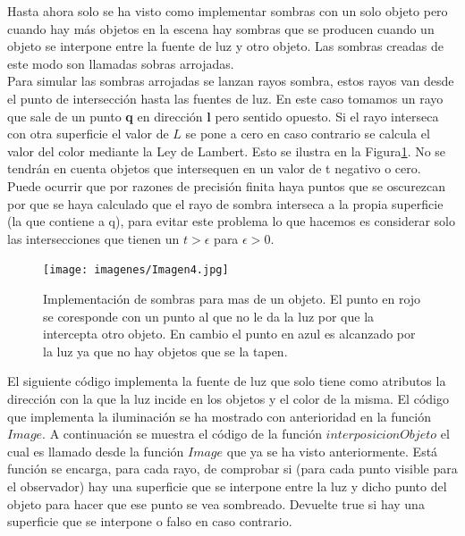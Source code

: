 Hasta ahora solo se ha visto como implementar sombras con un solo objeto pero cuando hay más objetos en la escena hay sombras que se producen cuando un objeto se interpone entre la fuente de luz y otro objeto. Las sombras creadas de este modo son llamadas sobras arrojadas.
	${ }$\\	
	
Para simular las sombras arrojadas se lanzan rayos sombra, estos rayos van desde el punto de intersección hasta las fuentes de luz. En este caso tomamos un rayo que sale de un punto \textbf{q} en dirección \textbf{l} pero sentido opuesto. Si el rayo interseca con otra superficie el valor de $L$ se pone a cero en caso contrario se calcula el valor del color mediante la Ley de Lambert. Esto se ilustra en la Figura\ref{fig:etiq_6}. No se tendrán en cuenta objetos que intersequen en un valor de t negativo o cero.
	${ }$\\	
	
Puede ocurrir que por razones de precisión finita haya puntos que se oscurezcan por que se haya calculado que el rayo de sombra interseca a la propia superficie (la que contiene a q), para evitar este problema lo que hacemos es considerar solo las intersecciones que tienen un $t > \epsilon$ para $\epsilon > 0 $.
	${ }$\\	

\begin{figure}[h]
	\begin{center}
		\texttt{[image: imagenes/Imagen4.jpg]}
	\end{center}
	\caption{Implementación de sombras para mas de un objeto. El punto en rojo se coresponde con un punto al que no le da la luz por que la intercepta otro objeto. En cambio el punto en azul es alcanzado por la luz ya que no hay objetos que se la tapen.}
	\label{fig:etiq_6}
\end{figure}

El siguiente código implementa la fuente de luz que solo tiene como atributos la dirección con la que la luz incide en los objetos y el color de la misma. El código que implementa la iluminación se ha mostrado con anterioridad en la función $Image$. A continuación se muestra el código de la función $interposicionObjeto$ el cual es llamado desde la función $Image$ que ya se ha visto anteriormente. Está función se encarga, para cada rayo, de comprobar si (para cada punto visible para el observador) hay una superficie que se interpone entre la luz y dicho punto del objeto para hacer que ese punto se vea sombreado. Devuelte true si hay una superficie que se interpone o falso en caso contrario.
	${ }$\\



